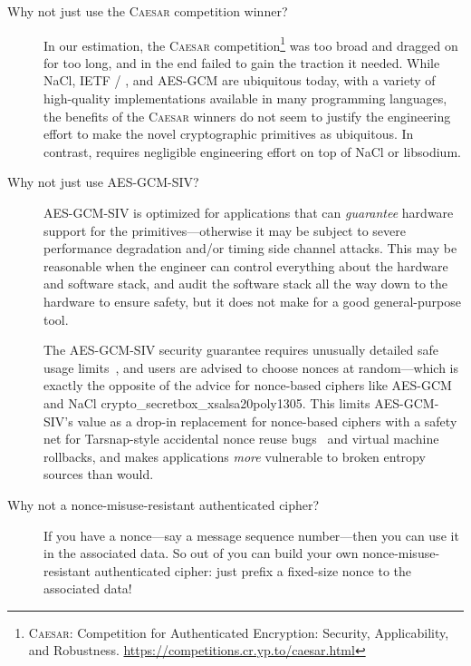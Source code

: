 \documentclass{article}
\def\operatorsc#1{{%
  \ifmmode\let\next=\operatorname\else\let\next=\relax\fi\next{\textsc{#1}}}}
\def\ChaCha#1/{\operatorsc{ChaCha#1}}
\def\Poly#1/{\operatorsc{Poly#1}}
\def\DAENCE/{\operatorsc{Daence}}
\def\CAESAR/{\textsc{Caesar}}
\def\NaCl/{NaCl}
\def\IETF/{IETF}
\def\Tarsnap/{Tarsnap}
\def\AESGCM/{AES\nobreakdash-GCM}
\def\AESGCMSIV/{AES\nobreakdash-GCM\nobreakdash-SIV}
\def\naclsecretbox/{crypto\_secretbox\_xsalsa20poly1305}
\def\libsodium/{libsodium}
\begin{document}
\begin{description}
  \item[Why not just use the \CAESAR/ competition winner?]
    In our estimation, the \CAESAR/
     competition\footnote{\CAESAR/: Competition for Authenticated
        Encryption: Security, Applicability, and Robustness.
       \url{https://competitions.cr.yp.to/caesar.html}}
     was too broad and dragged on for too long, and in the end failed
     to gain the traction it needed.
    While \NaCl/, \IETF/ \ChaCha//\Poly1305/, and \AESGCM/ are
     ubiquitous today, with a variety of high-quality implementations
     available in many programming languages, the benefits of the
     \CAESAR/ winners do not seem to justify the engineering effort to
     make the novel cryptographic primitives as ubiquitous.
    In contrast, \DAENCE/ requires negligible engineering effort on
     top of \NaCl/ or \libsodium/.

  \item[Why not just use \AESGCMSIV/?]
    \AESGCMSIV/ is optimized for applications that can
     \emph{guarantee} hardware support for the primitives---otherwise
     it may be subject to severe performance degradation and/or timing
     side channel attacks.
    This may be reasonable when the engineer can control everything
     about the hardware and software stack, and audit the software
     stack all the way down to the hardware to ensure safety, but it
     does not make for a good general-purpose tool.

    The \AESGCMSIV/ security guarantee requires unusually detailed
     safe usage limits~\cite[\S9]{rfc8452}, and users are advised to
     choose nonces at random---which is exactly the opposite of the
     advice for nonce-based ciphers like \AESGCM/ and \NaCl/
     \naclsecretbox/.
    This limits \AESGCMSIV/'s value as a drop-in replacement for
     nonce-based ciphers with a safety net for \Tarsnap/-style
     accidental nonce reuse
     bugs~\cite{cperciva2011tarsnap-nonce-reuse} and virtual machine
     rollbacks, and makes applications \emph{more} vulnerable to
     broken entropy sources than \DAENCE/ would.

  \item[Why not a nonce-misuse-resistant authenticated cipher?]
    If you have a nonce---say a message sequence number---then you can
     use it in the associated data.
    So out of \DAENCE/ you can build your own nonce-misuse-resistant
     authenticated cipher: just prefix a fixed-size nonce to the
     associated data!


\end{description}
\end{document}
